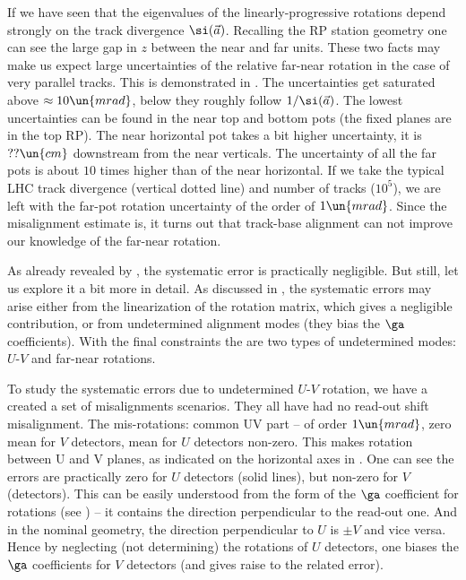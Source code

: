 If  we have seen that the eigenvalues of the linearly-progressive rotations depend strongly on the track divergence $\si(\vec a)$. Recalling the RP station geometry  one can see the large gap in $z$ between the near and far units. These two facts may make us expect large uncertainties of the relative far-near rotation in the case of very parallel tracks. This is demonstrated in . The uncertainties get saturated above $\approx 10\un{mrad}$, below they roughly follow $1/\si(\vec a)$. The lowest uncertainties can be found in the near top and bottom pots (the fixed planes are in the top RP). The near horizontal pot takes a bit higher uncertainty, it is $??\un{cm}$ downstream from the near verticals. The uncertainty of all the far pots is about $10$ times higher than of the near horizontal. If we take the typical LHC track divergence (vertical dotted line) and number of tracks ($10^5$), we are left with the far-pot rotation uncertainty of the order of $1\un{mrad}$. Since the misalignment estimate is, it turns out that track-base alignment can not improve our knowledge of the far-near rotation.


As already revealed by , the systematic error is practically negligible. But still, let us explore it a bit more in detail. As discussed in , the systematic errors may arise either from the linearization of the rotation matrix, which gives a negligible contribution, or from undetermined alignment modes (they bias the $\ga$ coefficients). With the final constraints the are two types of undetermined modes: $U$-$V$ and far-near rotations. 

To study the systematic errors due to undetermined $U$-$V$ rotation, we have a created a set of misalignments scenarios. They all have had no read-out shift misalignment. The mis-rotations: common UV part -- of order $1\un{mrad}$,  zero mean for $V$ detectors, mean for $U$ detectors non-zero. This makes rotation between U and V planes, as indicated on the horizontal axes in . One can see the errors are practically zero for $U$ detectors (solid lines), but non-zero for $V$ (detectors). This can be easily understood from the form of the $\ga$ coefficient for rotations (see ) -- it contains the direction perpendicular to the read-out one. And in the nominal geometry, the direction perpendicular to $U$ is $\pm V$ and vice versa. Hence by neglecting (not determining) the rotations of $U$ detectors, one biases the $\ga$ coefficients for $V$ detectors (and gives raise to the related error).

